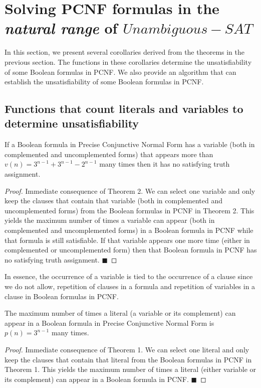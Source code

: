 \documentclass[runningheads,a4paper]{llncs}
\begin{document}
\section{Solving PCNF formulas in the \emph{natural range} of ${Unambiguous-SAT}$} 

In this section, we present several corollaries derived from the theorems in the previous section. The functions in these corollaries determine the unsatisfiability of some Boolean formulas in PCNF. We also provide an algorithm that can establish the unsatisfiability of some Boolean formulas in PCNF. 

\subsection{Functions that count literals and variables to determine unsatisfiability}
\begin{corollary}\normalfont
If a Boolean formula in Precise Conjunctive Normal Form has a variable (both in complemented and uncomplemented forms) that appears more than $v(n) = 3^{n-1}+3^{n-1}-2^{n-1}$ many times then it has no satisfying truth assignment.

\begin{proof}\normalfont
Immediate consequence of Theorem 2. We can select one variable and only keep the clauses that contain that variable (both in complemented and uncomplemented forms) from the Boolean formulas in PCNF in Theorem 2. This yields the maximum number of times a variable can appear (both in complemented and uncomplemented forms) in a Boolean formula in PCNF while that formula is still satisfiable. If that variable appears one more time (either in complemented or uncomplemented form) then that Boolean formula in PCNF has no satisfying truth assignment. $\blacksquare$

\end{proof}
\end{corollary}

In essence, the occurrence of a variable is tied to the occurrence of a clause since we do not allow, repetition of clauses in a formula and repetition of variables in a clause in Boolean formulas in PCNF.

\newpage

\begin{corollary}\normalfont
The maximum number of times a literal (a variable or its complement) can appear in a Boolean formula in Precise Conjunctive Normal Form is  $p(n) = 3^{n-1}$ many times. 
\begin{proof}\normalfont
Immediate consequence of Theorem 1. We can select one literal and only keep the clauses that contain that literal from the Boolean formulas in PCNF in Theorem 1. This yields the maximum number of times a literal (either variable or its complement) can appear in a Boolean formula in PCNF. $\blacksquare$
\end{proof}
\end{corollary}
\end{document}
